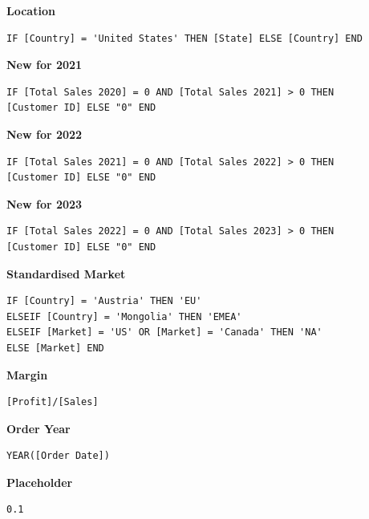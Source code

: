 \documentclass[12pt,a4paper]{article}
\begin{document}
\vspace*{1cm}

\textbf{Location}
\begin{lstlisting}[style=customstyle]
IF [Country] = 'United States' THEN [State] ELSE [Country] END
\end{lstlisting}
\vspace*{1cm}

\textbf{New for 2021}
\begin{lstlisting}[style=customstyle]
IF [Total Sales 2020] = 0 AND [Total Sales 2021] > 0 THEN
[Customer ID] ELSE "0" END
\end{lstlisting}
\vspace*{1cm}

\textbf{New for 2022}
\begin{lstlisting}[style=customstyle]
IF [Total Sales 2021] = 0 AND [Total Sales 2022] > 0 THEN
[Customer ID] ELSE "0" END
\end{lstlisting}
\vspace*{1cm}

\textbf{New for 2023}
\begin{lstlisting}[style=customstyle]
IF [Total Sales 2022] = 0 AND [Total Sales 2023] > 0 THEN
[Customer ID] ELSE "0" END
\end{lstlisting}
\vspace*{1cm}

\textbf{Standardised Market}
\begin{lstlisting}[style=customstyle]
IF [Country] = 'Austria' THEN 'EU'
ELSEIF [Country] = 'Mongolia' THEN 'EMEA'
ELSEIF [Market] = 'US' OR [Market] = 'Canada' THEN 'NA'
ELSE [Market] END
\end{lstlisting}
\vspace*{1cm}

\textbf{Margin}
\begin{lstlisting}[style=customstyle]
[Profit]/[Sales]
\end{lstlisting}
\vspace*{1cm}

\textbf{Order Year}
\begin{lstlisting}[style=customstyle]
YEAR([Order Date])
\end{lstlisting}
\vspace*{1cm}

\textbf{Placeholder}
\begin{lstlisting}[style=customstyle]
0.1
\end{lstlisting}
\vspace*{1cm}
\end{document}
